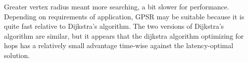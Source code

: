 \documentclass{article}
\begin{document}
Greater vertex radius meant more searching, a bit slower for performance.
Depending on requirements of application, GPSR may be suitable because it is
quite fast relative to Dijkstra's algorithm. The two versions of Dijkstra's
algorithm are similar, but it appears that the dijkstra algorithm optimizing
for hops has a relatively small advantage time-wise against the
latency-optimal solution.
\end{document}
